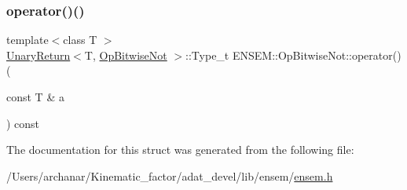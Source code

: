 \mbox{\label{structENSEM_1_1OpBitwiseNot_acfac2b63c37a3d1c576ba131caf869f6}} 
\subsubsection{\texorpdfstring{operator()()}{operator()()}\hspace{0.1cm}{\footnotesize\ttfamily [2/2]}}
{\footnotesize\ttfamily template$<$class T $>$ \\
\mbox{\hyperlink{structENSEM_1_1UnaryReturn}{Unary\+Return}}$<$T, \mbox{\hyperlink{structENSEM_1_1OpBitwiseNot}{Op\+Bitwise\+Not}} $>$\+::Type\+\_\+t E\+N\+S\+E\+M\+::\+Op\+Bitwise\+Not\+::operator() (\begin{DoxyParamCaption}\item[{const T \&}]{a }\end{DoxyParamCaption}) const\hspace{0.3cm}{\ttfamily [inline]}}



The documentation for this struct was generated from the following file\+:\begin{DoxyCompactItemize}
\item 
/\+Users/archanar/\+Kinematic\+\_\+factor/adat\+\_\+devel/lib/ensem/\mbox{\hyperlink{lib_2ensem_2ensem_8h}{ensem.\+h}}\end{DoxyCompactItemize}
